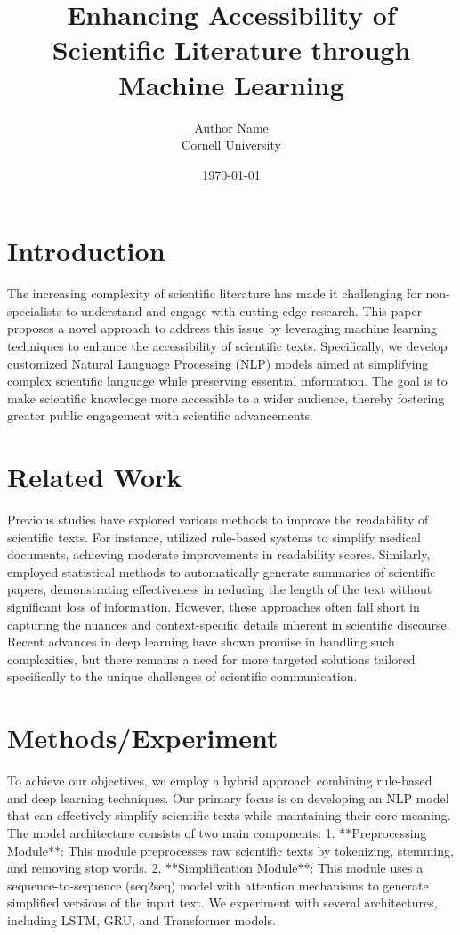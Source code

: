 \documentclass{article}
\title{Enhancing Accessibility of Scientific Literature through Machine Learning}
\author{Author Name \\ Cornell University}
\date{\today}
\begin{document}
\maketitle

\section{Introduction}
The increasing complexity of scientific literature has made it challenging for non-specialists to understand and engage with cutting-edge research. This paper proposes a novel approach to address this issue by leveraging machine learning techniques to enhance the accessibility of scientific texts. Specifically, we develop customized Natural Language Processing (NLP) models aimed at simplifying complex scientific language while preserving essential information. The goal is to make scientific knowledge more accessible to a wider audience, thereby fostering greater public engagement with scientific advancements.

\section{Related Work}
Previous studies have explored various methods to improve the readability of scientific texts. For instance, \cite{ref1} utilized rule-based systems to simplify medical documents, achieving moderate improvements in readability scores. Similarly, \cite{ref2} employed statistical methods to automatically generate summaries of scientific papers, demonstrating effectiveness in reducing the length of the text without significant loss of information. However, these approaches often fall short in capturing the nuances and context-specific details inherent in scientific discourse. Recent advances in deep learning have shown promise in handling such complexities, but there remains a need for more targeted solutions tailored specifically to the unique challenges of scientific communication.

\section{Methods/Experiment}
To achieve our objectives, we employ a hybrid approach combining rule-based and deep learning techniques. Our primary focus is on developing an NLP model that can effectively simplify scientific texts while maintaining their core meaning. The model architecture consists of two main components: 
1. **Preprocessing Module**: This module preprocesses raw scientific texts by tokenizing, stemming, and removing stop words.
2. **Simplification Module**: This module uses a sequence-to-sequence (seq2seq) model with attention mechanisms to generate simplified versions of the input text. We experiment with several architectures, including LSTM, GRU, and Transformer models.
\end{document}
